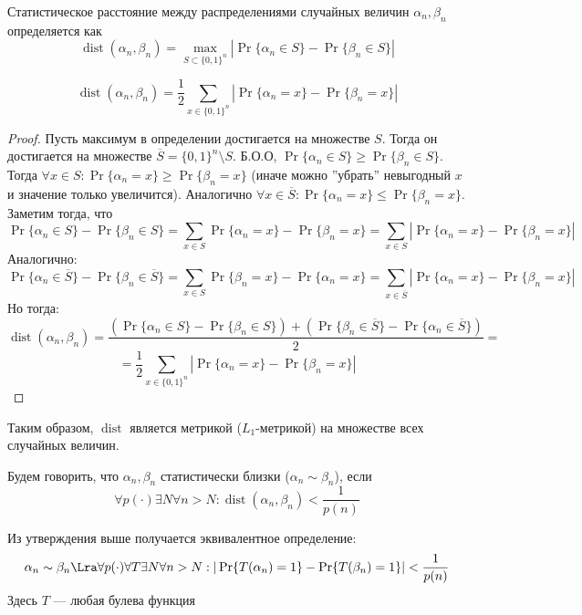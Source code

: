 \begin{definition}
    Статистическое расстояние между распределениями случайных величин \(\alpha_n, \beta_n\) определяется как
    \[\operatorname{dist}(\alpha_n, \beta_n) = \max_{S \subset \{0, 1\}^n} |\Pr\{\alpha_n \in S\} - \Pr\{\beta_n \in S\}|\]
\end{definition}

\begin{proposition}
    \[\operatorname{dist}(\alpha_n, \beta_n) = \frac{1}{2}\sum_{x \in \{0, 1\}^n} |\Pr\{\alpha_n = x\} - \Pr\{\beta_n = x\}|\]
\end{proposition}
\begin{proof}
    Пусть максимум в определении достигается на множестве \(S\). Тогда он достигается на множестве \(\overline{S} = \{0, 1\}^n \setminus S\). Б.О.О, \(\Pr\{\alpha_n \in S\} \ge \Pr\{\beta_n \in S\}\). Тогда \(\forall x \in S: \Pr\{\alpha_n = x\} \ge \Pr\{\beta_n = x\}\) (иначе можно ''убрать'' невыгодный \(x\) и значение только увеличится). Аналогично \(\forall x \in \overline{S}: \Pr\{\alpha_n = x\} \le \Pr\{\beta_n = x\}\). Заметим тогда, что
    \[\Pr\{\alpha_n \in S\} - \Pr\{\beta_n \in S\} = \sum_{x \in S} \Pr\{\alpha_n = x\} - \Pr\{\beta_n = x\} = \sum_{x \in S} |\Pr\{\alpha_n = x\} - \Pr\{\beta_n = x\}|\]
    Аналогично:
    \[\Pr\{\alpha_n \in \overline{S}\} - \Pr\{\beta_n \in \overline{S}\} = \sum_{x \in S} \Pr\{\beta_n = x\} - \Pr\{\alpha_n = x\} = \sum_{x \in \overline{S}} |\Pr\{\alpha_n = x\} - \Pr\{\beta_n = x\}|\]
    Но тогда:
    \[\operatorname{dist}(\alpha_n, \beta_n) = \frac{\left( \Pr\{\alpha_n \in S\} - \Pr\{\beta_n \in S\} \right) + \left( \Pr\{\beta_n \in \overline{S}\} - \Pr\{\alpha_n \in \overline{S}\} \right)}{2} = \]
    \[= \frac{1}{2}\sum_{x \in \{0, 1\}^n} |\Pr\{\alpha_n = x\} - \Pr\{\beta_n = x\}|\]
\end{proof}

\begin{note}
    Таким образом, \(\operatorname{dist}\) является метрикой (\(L_1\)-метрикой) на множестве всех случайных величин.
\end{note}

\begin{definition}
    Будем говорить, что \(\alpha_n, \beta_n\) статистически близки (\(\alpha_n \sim \beta_n\)), если 
    \[\forall p(\cdot) \exists N \forall n > N: \operatorname{dist}(\alpha_n, \beta_n) < \frac{1}{p(n)}\]
\end{definition}

\begin{note}
    Из утверждения выше получается эквивалентное определение:
    \[\alpha_n \sim \beta_n \Lra \forall p(\cdot) \forall T \exists N \forall n > N: |\Pr\{T(\alpha_n) = 1\} - \Pr\{T(\beta_n) = 1\}| < \frac{1}{p(n)}\]
    Здесь \(T\) --- любая булева функция
\end{note}

